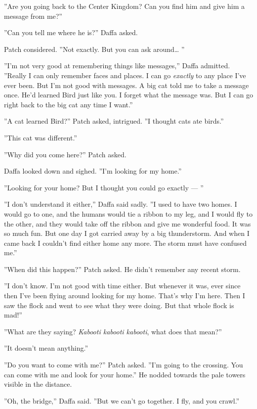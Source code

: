 \documentclass[12pt]{book}
\begin{document}
''Are you going back to the Center Kingdom? Can you find him and give him a message from me?''

''Can you tell me where he is?'' Daffa asked.

Patch considered. ''Not exactly. But you can ask around\ldots{}
''

''I'm not very good at remembering things like messages,'' Daffa admitted. ''Really I can only remember faces and places. I can go {\it exactly} to any place I've ever been. But I'm not good with messages. A big cat told me to take a message once. He'd learned Bird just like you. I forget what the message was. But I can go right back to the big cat any time I want.''

''A cat learned Bird?'' Patch asked, intrigued. ''I thought cats ate birds.''

''This cat was different.''

''Why did you come here?'' Patch asked.

Daffa looked down and sighed. ''I'm looking for my home.''

''Looking for your home? But I thought you could go exactly ---
''

''I don't understand it either,'' Daffa said sadly. ''I used to have two homes. I would go to one, and the humans would tie a ribbon to my leg, and I would fly to the other, and they would take off the ribbon and give me wonderful food. It was so much fun. But one day I got carried away by a big thunderstorm. And when I came back I couldn't find either home any more. The storm must have confused me.''

''When did this happen?'' Patch asked. He didn't remember any recent storm.

''I don't know. I'm not good with time either. But whenever it was, ever since then I've been flying around looking for my home. That's why I'm here. Then I saw the flock and went to see what they were doing. But that whole flock is mad!''

''What are they saying? {\it Kabooti kabooti kabooti}, what does that mean?''

''It doesn't mean anything.''

''Do you want to come with me?'' Patch asked. ''I'm going to the crossing. You can come with me and look for your home.'' He nodded towards the pale towers visible in the distance.

''Oh, the bridge,'' Daffa said. ''But we can't go together. I fly, and you crawl.''
\end{document}
